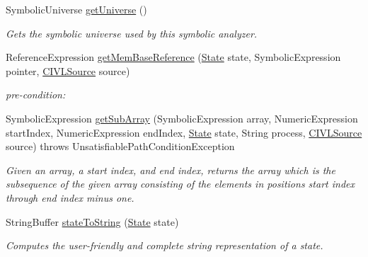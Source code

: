 \begin{DoxyCompactItemize}
\item 
Symbolic\+Universe \hyperlink{classedu_1_1udel_1_1cis_1_1vsl_1_1civl_1_1semantics_1_1common_1_1CommonSymbolicAnalyzer_a58fe750cba5db0ac34168e34b383818d}{get\+Universe} ()
\begin{DoxyCompactList}\small\item\em Gets the symbolic universe used by this symbolic analyzer. \end{DoxyCompactList}\item 
Reference\+Expression \hyperlink{classedu_1_1udel_1_1cis_1_1vsl_1_1civl_1_1semantics_1_1common_1_1CommonSymbolicAnalyzer_a869ebc146a241c10b575fa195366e07d}{get\+Mem\+Base\+Reference} (\hyperlink{interfaceedu_1_1udel_1_1cis_1_1vsl_1_1civl_1_1state_1_1IF_1_1State}{State} state, Symbolic\+Expression pointer, \hyperlink{interfaceedu_1_1udel_1_1cis_1_1vsl_1_1civl_1_1model_1_1IF_1_1CIVLSource}{C\+I\+V\+L\+Source} source)
\begin{DoxyCompactList}\small\item\em pre-\/condition\+: \end{DoxyCompactList}\item 
Symbolic\+Expression \hyperlink{classedu_1_1udel_1_1cis_1_1vsl_1_1civl_1_1semantics_1_1common_1_1CommonSymbolicAnalyzer_a0d92603fac82fc1c76c88b6ab7f7d16a}{get\+Sub\+Array} (Symbolic\+Expression array, Numeric\+Expression start\+Index, Numeric\+Expression end\+Index, \hyperlink{interfaceedu_1_1udel_1_1cis_1_1vsl_1_1civl_1_1state_1_1IF_1_1State}{State} state, String process, \hyperlink{interfaceedu_1_1udel_1_1cis_1_1vsl_1_1civl_1_1model_1_1IF_1_1CIVLSource}{C\+I\+V\+L\+Source} source)  throws Unsatisfiable\+Path\+Condition\+Exception 
\begin{DoxyCompactList}\small\item\em Given an array, a start index, and end index, returns the array which is the subsequence of the given array consisting of the elements in positions start index through end index minus one. \end{DoxyCompactList}\item 
String\+Buffer \hyperlink{classedu_1_1udel_1_1cis_1_1vsl_1_1civl_1_1semantics_1_1common_1_1CommonSymbolicAnalyzer_aed777769775cde37062975ba085047b5}{state\+To\+String} (\hyperlink{interfaceedu_1_1udel_1_1cis_1_1vsl_1_1civl_1_1state_1_1IF_1_1State}{State} state)
\begin{DoxyCompactList}\small\item\em Computes the user-\/friendly and complete string representation of a state. \end{DoxyCompactList}\item 

\end{DoxyCompactItemize}
